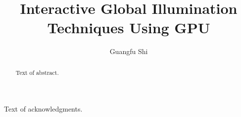 \documentclass[12pt]{report}
\author{Guangfu Shi}
\title{Interactive Global Illumination Techniques Using GPU}
\begin{document}
\begin{abstract}
  Text of abstract.  
\end{abstract}

\begin{acknowledgments}
  Text of acknowledgments.
\end{acknowledgments}


\setcounter{page}{1}















%

%
\end{document}

